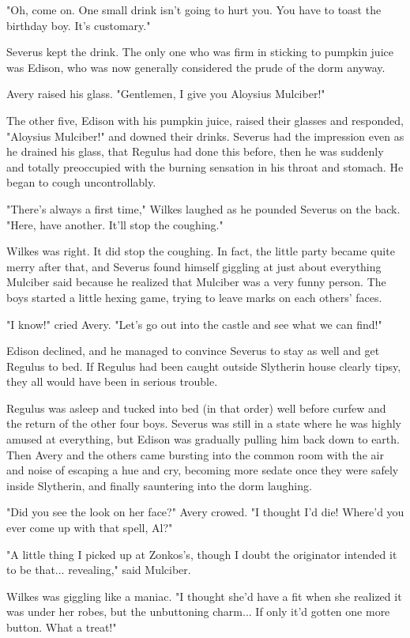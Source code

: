 \documentclass[a4paper,11pt]{article}
\begin{document}
"Oh, come on. One small drink isn't going to hurt you. You have to toast the birthday boy. It's customary."

Severus kept the drink. The only one who was firm in sticking to pumpkin juice was Edison, who was now generally considered the prude of the dorm anyway.

Avery raised his glass. "Gentlemen, I give you Aloysius Mulciber!"

The other five, Edison with his pumpkin juice, raised their glasses and responded, "Aloysius Mulciber!" and downed their drinks. Severus had the impression even as he drained his glass, that Regulus had done this before, then he was suddenly and totally preoccupied with the burning sensation in his throat and stomach. He began to cough uncontrollably.

"There's always a first time," Wilkes laughed as he pounded Severus on the back. "Here, have another. It'll stop the coughing."

Wilkes was right. It did stop the coughing. In fact, the little party became quite merry after that, and Severus found himself giggling at just about everything Mulciber said because he realized that Mulciber was a very funny person. The boys started a little hexing game, trying to leave marks on each others' faces.

"I know!" cried Avery. "Let's go out into the castle and see what we can find!"

Edison declined, and he managed to convince Severus to stay as well and get Regulus to bed. If Regulus had been caught outside Slytherin house clearly tipsy, they all would have been in serious trouble.

Regulus was asleep and tucked into bed (in that order) well before curfew and the return of the other four boys. Severus was still in a state where he was highly amused at everything, but Edison was gradually pulling him back down to earth. Then Avery and the others came bursting into the common room with the air and noise of escaping a hue and cry, becoming more sedate once they were safely inside Slytherin, and finally sauntering into the dorm laughing.

"Did you see the look on her face?" Avery crowed. "I thought I'd die! Where'd you ever come up with that spell, Al?"

"A little thing I picked up at Zonkos's, though I doubt the originator intended it to be that... revealing," said Mulciber.

Wilkes was giggling like a maniac. "I thought she'd have a fit when she realized it was under her robes, but the unbuttoning charm... If only it'd gotten one more button. What a treat!"
\end{document}
